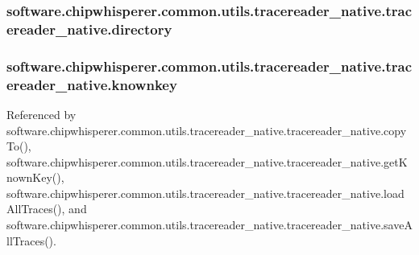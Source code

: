 \subsubsection[{directory}]{\setlength{\rightskip}{0pt plus 5cm}software.\+chipwhisperer.\+common.\+utils.\+tracereader\+\_\+native.\+tracereader\+\_\+native.\+directory}\label{classsoftware_1_1chipwhisperer_1_1common_1_1utils_1_1tracereader__native_1_1tracereader__native_ab3b8d37456d0e43f1b9a71f4fe443d52}
\hypertarget{classsoftware_1_1chipwhisperer_1_1common_1_1utils_1_1tracereader__native_1_1tracereader__native_a9b6cb9dfa022ff9b51cdcd8df5acc1dc}{}
\subsubsection[{knownkey}]{\setlength{\rightskip}{0pt plus 5cm}software.\+chipwhisperer.\+common.\+utils.\+tracereader\+\_\+native.\+tracereader\+\_\+native.\+knownkey}\label{classsoftware_1_1chipwhisperer_1_1common_1_1utils_1_1tracereader__native_1_1tracereader__native_a9b6cb9dfa022ff9b51cdcd8df5acc1dc}


Referenced by software.\+chipwhisperer.\+common.\+utils.\+tracereader\+\_\+native.\+tracereader\+\_\+native.\+copy\+To(), software.\+chipwhisperer.\+common.\+utils.\+tracereader\+\_\+native.\+tracereader\+\_\+native.\+get\+Known\+Key(), software.\+chipwhisperer.\+common.\+utils.\+tracereader\+\_\+native.\+tracereader\+\_\+native.\+load\+All\+Traces(), and software.\+chipwhisperer.\+common.\+utils.\+tracereader\+\_\+native.\+tracereader\+\_\+native.\+save\+All\+Traces().

\hypertarget{classsoftware_1_1chipwhisperer_1_1common_1_1utils_1_1tracereader__native_1_1tracereader__native_a895e1a570e0153fa81ca4ec24225bdd8}{}

